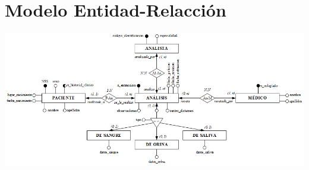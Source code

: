 \documentclass[a4paper,10pt]{article}
\begin{document}
\pagebreak
\section{Modelo Entidad-Relacción}
\begin{centering}
\includegraphics[scale=.63, angle=90]{img/er.png}\\
\end{centering}
\end{document}
